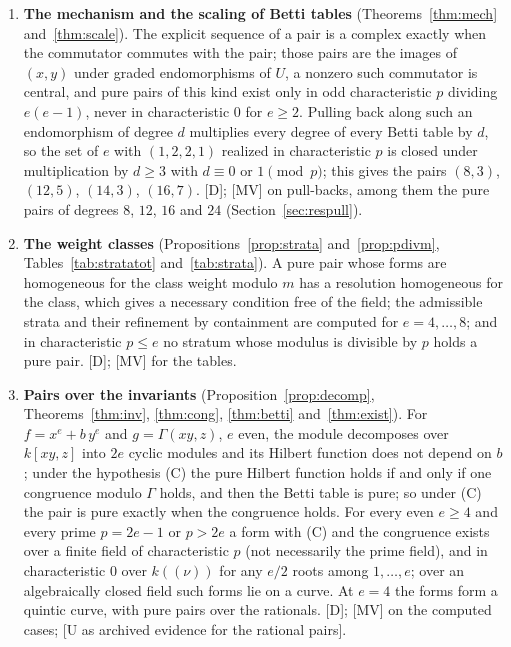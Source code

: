 \documentclass[11pt]{article}
\theoremstyle{definition}
\theoremstyle{remark}
\begin{document}
\begin{enumerate}
\item \textbf{The mechanism and the scaling of Betti tables} (Theorems~\ref{thm:mech} and~\ref{thm:scale}). The explicit sequence of a pair is a complex exactly when the commutator commutes with the pair; those pairs are the images of $(x,y)$ under graded endomorphisms of $U$, a nonzero such commutator is central, and pure pairs of this kind exist only in odd characteristic $p$ dividing $e(e-1)$, never in characteristic $0$ for $e\ge2$. Pulling back along such an endomorphism of degree $d$ multiplies every degree of every Betti table by $d$, so the set of $e$ with $(1,2,2,1)$ realized in characteristic $p$ is closed under multiplication by $d\ge3$ with $d\equiv0$ or $1\pmod p$; this gives the pairs $(8,3)$, $(12,5)$, $(14,3)$, $(16,7)$. [D]; [MV] on \npbCases{} pull-backs, among them the pure pairs of degrees $8$, $12$, $16$ and $24$ (Section~\ref{sec:respull}).
\item \textbf{The weight classes} (Propositions~\ref{prop:strata} and~\ref{prop:pdivm}, Tables~\ref{tab:stratatot} and~\ref{tab:strata}). A pure pair whose forms are homogeneous for the class weight modulo $m$ has a resolution homogeneous for the class, which gives a necessary condition free of the field; the admissible strata and their refinement by containment are computed for $e=4,\dots,8$; and in characteristic $p\le e$ no stratum whose modulus is divisible by $p$ holds a pure pair. [D]; [MV] for the tables.
\item \textbf{Pairs over the invariants} (Proposition~\ref{prop:decomp}, Theorems~\ref{thm:inv}, \ref{thm:cong}, \ref{thm:betti} and~\ref{thm:exist}). For $f=x^e+b\,y^e$ and $g=\Gamma(xy,z)$, $e$ even, the module decomposes over $k[xy,z]$ into $2e$ cyclic modules and its Hilbert function does not depend on $b$; under the hypothesis (C) the pure Hilbert function holds if and only if one congruence modulo $\Gamma$ holds, and then the Betti table is pure; so under (C) the pair is pure exactly when the congruence holds. For every even $e\ge4$ and every prime $p=2e-1$ or $p>2e$ a form with (C) and the congruence exists over a finite field of characteristic $p$ (not necessarily the prime field), and in characteristic $0$ over $k((\nu))$ for any $e/2$ roots among $1,\dots,e$; over an algebraically closed field such forms lie on a curve. At $e=4$ the forms form a quintic curve, with pure pairs over the rationals. [D]; [MV] on the computed cases; [U as archived evidence for the rational pairs].

\end{enumerate}
\end{document}

